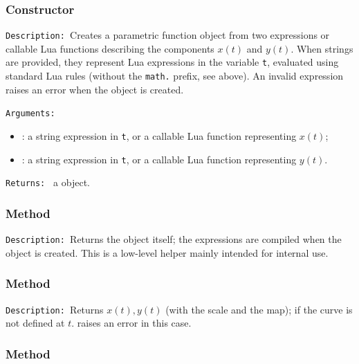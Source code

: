 \subsubsection{Constructor }
\label{ssub:method_pfct_new}

\texttt{Description: }Creates a parametric function object from two expressions
or callable Lua functions describing the components $x(t)$ and $y(t)$. When
strings are provided, they represent Lua expressions in the variable
\texttt{t}, evaluated using standard Lua rules (without the \texttt{math.}
prefix, see above). An invalid expression raises an error when the object is created.

\texttt{Arguments: }\par
\begin{itemize}
\item {}: a string expression in \texttt{t}, or a callable Lua
      function representing $x(t)$;
\item {}: a string expression in \texttt{t}, or a callable Lua
      function representing $y(t)$.
\end{itemize}

\texttt{Returns: } a  object.

\subsubsection{Method }
\label{ssub:method_pfct_compile}

\texttt{Description: }Returns the object itself; the expressions are compiled
when the object is created. This is a low-level helper mainly intended for
internal use.

\subsubsection{Method }
\label{ssub:method_pfct_eval}

\texttt{Description: }Returns $x(t), y(t)$ (with the scale and the map);
 if the curve is not defined at $t$.  raises an
error in this case.


\subsubsection{Method }
\label{ssub:method_pfct_x}


